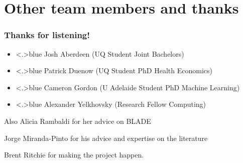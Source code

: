 \documentclass[handout,english]{beamer}
\begin{document}
\section{Other team members and thanks}
\begin{frame}
  \frametitle{Thanks for listening!}

\begin{itemize}
\item<+-|alert@+>{\color<.>{blue}
        Josh Aberdeen (UQ Student Joint Bachelors)}
\item<+-|alert@+>{\color<.>{blue}
        Patrick Duenow (UQ Student PhD Health Economics)
        }
\item<+-|alert@+>{\color<.>{blue}
        Cameron Gordon (U Adelaide Student PhD Machine Learning)
        }
\item<+-|alert@+>{\color<.>{blue}
    Alexander Yelkhovsky (Research Fellow Computing)
  }
\end{itemize}
Also Alicia Rambaldi for her advice on BLADE

Jorge Miranda-Pinto for his advice and expertise on the literature

Brent Ritchie for making the project happen.

\vfill\end{frame}
\end{document}
